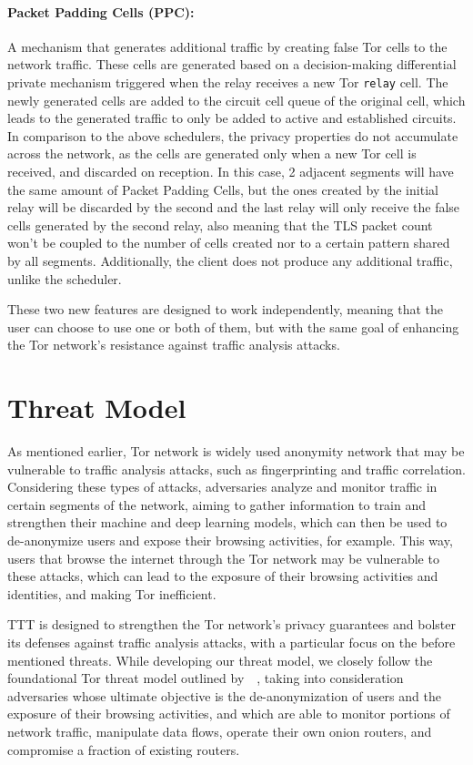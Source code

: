 \paragraph{Packet Padding Cells (PPC):} A mechanism that generates additional traffic by creating false Tor cells to the network traffic. These cells are generated based on a decision-making differential private mechanism triggered when the relay receives a new Tor \texttt{relay} cell. The newly generated cells are added to the circuit cell queue of the original cell, which leads to the generated traffic to only be added to active and established circuits.  In comparison to the above schedulers, the privacy properties do not accumulate across the network, as the cells are generated only when a new Tor cell is received, and discarded on reception. 
In this case, 2 adjacent segments will have the same amount of Packet Padding Cells, but the ones created by the initial relay will be discarded by the second and the last relay will only receive the false cells generated by the second relay, also meaning that the TLS packet count won't be coupled to the number of cells created nor to a certain pattern shared by all segments. Additionally, the client does not produce any additional traffic, unlike the scheduler.

These two new features are designed to work independently, meaning that the user can choose to use one or both of them, but with the same goal of enhancing the Tor network's resistance against traffic analysis attacks.


\section{Threat Model}\label{sec:threat_model}

As mentioned earlier, Tor network is widely used anonymity network that may be vulnerable to traffic analysis attacks, such as fingerprinting and traffic correlation. Considering these types of attacks, adversaries analyze and monitor traffic in certain segments of the network, aiming to gather information to train and strengthen their machine and deep learning models, which can then be used to de-anonymize users and expose their browsing activities, for example. This way, users that browse the internet through the Tor network may be vulnerable to these attacks, which can lead to the exposure of their browsing activities and identities, and making Tor inefficient. 

TTT is designed to strengthen the Tor network's privacy guarantees and bolster its defenses against traffic analysis attacks, with a particular focus on the before mentioned threats. While developing our threat model, we closely follow the foundational Tor threat model outlined by~\autocite{dingledine2004tor}~\cite{dingledine2004tor}, taking into consideration adversaries whose ultimate objective is the de-anonymization of users and the exposure of their browsing activities, and which are able to monitor portions of network traffic, manipulate data flows, operate their own onion routers, and compromise a fraction of existing routers.

